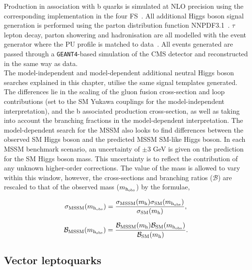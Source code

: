 Production in association with b quarks is simulated at \ac{NLO} precision using the corresponding  implementation in the four \ac{FS}~\cite{Nason:2004rx,Frixione:2007vw,Alioli:2010xd,Jezo:2015aia}.
All additional Higgs boson signal generation is performed using the parton distribution function NNPDF3.1~\cite{Ball:2014uwa,Ball:2017nwa}.
$\tau$ lepton decay, parton showering and hadronisation are all modelled with the \PYTHIA event generator where the \ac{PU} profile is matched to data~\cite{Sirunyan:2019dfx,Sjostrand:2014zea}.
All events generated are passed through a \texttt{GEANT4}-based \cite{Agostinelli:2002hh} simulation of the \ac{CMS} detector and reconstructed in the same way as data. \\

The model-independent and model-dependent additional neutral Higgs boson searches explained in this chapter, utilise the same signal templates generated. 
The differences lie in the scaling of the gluon fusion cross-section and loop contributions (set to the \ac{SM} Yukawa couplings for the model-independent interpretation), and the b associated production cross-section, as well as taking into account the branching fractions in the model-dependent interpretation.
The model-dependent search for the \ac{MSSM} also looks to find differences between the observed \ac{SM} Higgs boson and the predicted \ac{MSSM} \ac{SM}-like Higgs boson.
In each \ac{MSSM} benchmark scenario, an uncertainty of $\pm 3$ GeV is given on the prediction for the \ac{SM} Higgs boson mass.
This uncertainty is to reflect the contribution of any unknown higher-order corrections.
The value of the mass is allowed to vary within this window, however, the cross-sections and branching ratios ($\mathcal{B}$) are rescaled to that of the observed mass ($m_{{\text{h}}_{\text{obs}}}$) by the formulae,

\begin{equation}
\sigma_{\text{MSSM}} (m_{{\text{h}}_{\text{obs}}}) = \frac{\sigma_{\text{MSSM}} (m_{{\text{h}}}) \sigma_{\text{SM}} (m_{{\text{h}}_{\text{obs}}})}{\sigma_{\text{SM}} (m_{{\text{h}}})},
\end{equation}

\begin{equation}
\mathcal{B}_{\text{MSSM}} (m_{{\text{h}}_{\text{obs}}}) = \frac{\mathcal{B}_{\text{MSSM}} (m_{{\text{h}}}) \mathcal{B}_{\text{SM}} (m_{{\text{h}}_{\text{obs}}})}{\mathcal{B}_{\text{SM}} (m_{{\text{h}}})}.
\end{equation}

\subsection{Vector leptoquarks}
\label{sec:vlq}

